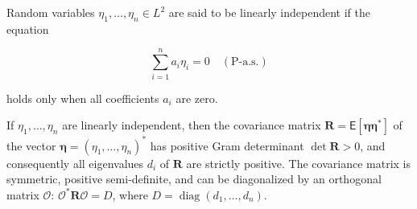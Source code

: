Random variables $\eta_1, \ldots, \eta_n \in L^2$ are said to be linearly independent if the equation

$$\sum_{i=1}^{n} a_i \eta_i = 0 \quad (\text{P-a.s.})$$

holds only when all coefficients $a_i$ are zero.

If $\eta_1, \ldots, \eta_n$ are linearly independent, then the covariance matrix $\mathbf{R} = \mathsf{E}[\boldsymbol{\eta} \boldsymbol{\eta}^*]$ of the vector $\boldsymbol{\eta} = (\eta_1, \ldots, \eta_n)^*$ has positive Gram determinant $\det \mathbf{R} > 0$, and consequently all eigenvalues $d_i$ of $\mathbf{R}$ are strictly positive. The covariance matrix is symmetric, positive semi-definite, and can be diagonalized by an orthogonal matrix $\mathcal{O}$: $\mathcal{O}^* \mathbf{R} \mathcal{O} = D$, where $D = \operatorname{diag}(d_1, \ldots, d_n)$.

